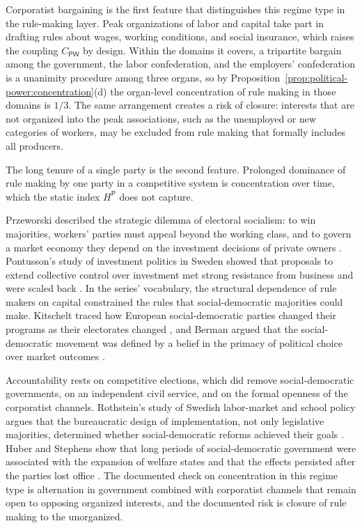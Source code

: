 \documentclass[11pt,letterpaper]{article}
\theoremstyle{definition}
\theoremstyle{remark}
\newcommand{\pP}{\mathsf{P}}
\newcommand{\pW}{\mathsf{W}}
\begin{document}
Corporatist bargaining is the first feature that distinguishes this regime type in the rule-making layer. Peak organizations of labor and capital take part in drafting rules about wages, working conditions, and social insurance, which raises the coupling $C_{\pP\pW}$ by design. Within the domains it covers, a tripartite bargain among the government, the labor confederation, and the employers' confederation is a unanimity procedure among three organs, so by Proposition~\ref{prop:political-power:concentration}(d) the organ-level concentration of rule making in those domains is $1/3$. The same arrangement creates a risk of closure: interests that are not organized into the peak associations, such as the unemployed or new categories of workers, may be excluded from rule making that formally includes all producers.

The long tenure of a single party is the second feature. Prolonged dominance of rule making by one party in a competitive system is concentration over time, which the static index $H^{\pP}$ does not capture.

Przeworski described the strategic dilemma of electoral socialism: to win majorities, workers' parties must appeal beyond the working class, and to govern a market economy they depend on the investment decisions of private owners \citep{przeworski1985}. Pontusson's study of investment politics in Sweden showed that proposals to extend collective control over investment met strong resistance from business and were scaled back \citep{pontusson1992}. In the series' vocabulary, the structural dependence of rule makers on capital constrained the rules that social-democratic majorities could make. Kitschelt traced how European social-democratic parties changed their programs as their electorates changed \citep{kitschelt1994}, and Berman argued that the social-democratic movement was defined by a belief in the primacy of political choice over market outcomes \citep{berman2006}.

Accountability rests on competitive elections, which did remove social-democratic governments, on an independent civil service, and on the formal openness of the corporatist channels. Rothstein's study of Swedish labor-market and school policy argues that the bureaucratic design of implementation, not only legislative majorities, determined whether social-democratic reforms achieved their goals \citep{rothstein1996}. Huber and Stephens show that long periods of social-democratic government were associated with the expansion of welfare states and that the effects persisted after the parties lost office \citep{huber2001}. The documented check on concentration in this regime type is alternation in government combined with corporatist channels that remain open to opposing organized interests, and the documented risk is closure of rule making to the unorganized.
\end{document}
